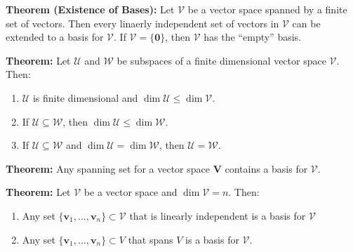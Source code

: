 \documentclass{article}
\begin{document}
\begin{minipage}[t]{.45\textwidth}
        \textbf{Theorem (Existence of Bases):} Let $\mathcal{V}$ be a vector space spanned by a finite set of vectors. Then every linaerly independent set of vectors in $\mathcal{V}$ can be extended to a basis for $\mathcal{V}$. If $\mathcal{V} = \{\bm{0}\}$, then $\mathcal{V}$ has the ``empty'' basis.
        \vspace{2mm}

        \textbf{Theorem:} Let $\mathcal{U}$ and $\mathcal{W}$ be subspaces of a finite dimensional vector space $\mathcal{V}$. Then:
        \begin{enumerate}
            \item $\mathcal{U}$ is finite dimensional and $\dim \mathcal{U} \le \dim \mathcal{V}$.
            \item If $\mathcal{U} \subseteq \mathcal{W}$, then $\dim \mathcal{U} \le \dim \mathcal{W}$.
            \item If $\mathcal{U} \subseteq \mathcal{W}$ and $\dim \mathcal{U} = \dim\mathcal{W}$, then $\mathcal{U} = \mathcal{W}$.
        \end{enumerate}
        \vspace{2mm}

        \textbf{Theorem:} Any spanning set for a vector space $\bm{V}$ contains a basis for $\mathcal{V}$.
        \vspace{2mm}

        \textbf{Theorem:} Let $\mathcal{V}$ be a vector space and $\dim \mathcal{V} = n$. Then:
        \begin{enumerate}
            \item Any set $\{\bm{v}_1,\dots,\bm{v}_n\} \subset \mathcal{V}$ that is linearly independent is a basis for $\mathcal{V}$
            \item Any set $\{\bm{v}_1,\dots,\bm{v}_n\} \subset V$ that spans $V$ is a basis for $\mathcal{V}$.
        \end{enumerate}
    \end{minipage}
    \hfill
\end{document}
